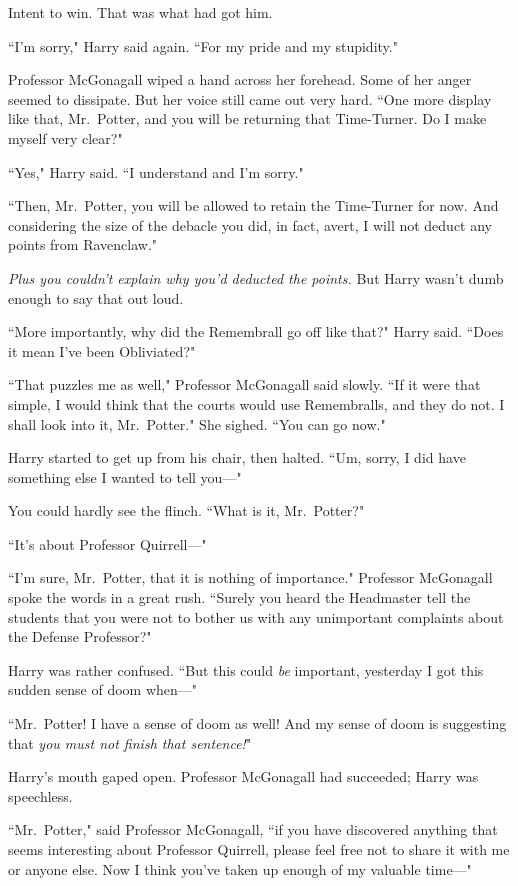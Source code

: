 Intent to win. That was what had got him.

``I'm sorry," Harry said again. ``For my pride and my stupidity."

Professor McGonagall wiped a hand across her forehead. Some of her anger seemed to dissipate. But her voice still came out very hard. ``One more display like that, Mr.~Potter, and you will be returning that Time-Turner. Do I make myself very clear?"

``Yes," Harry said. ``I understand and I'm sorry."

``Then, Mr.~Potter, you will be allowed to retain the Time-Turner for now. And considering the size of the debacle you did, in fact, avert, I will not deduct any points from Ravenclaw."

\emph{Plus you couldn't explain why you'd deducted the points.} But Harry wasn't dumb enough to say that out loud.

``More importantly, why did the Remembrall go off like that?" Harry said. ``Does it mean I've been Obliviated?"

``That puzzles me as well," Professor McGonagall said slowly. ``If it were that simple, I would think that the courts would use Remembralls, and they do not. I shall look into it, Mr.~Potter." She sighed. ``You can go now."

Harry started to get up from his chair, then halted. ``Um, sorry, I did have something else I wanted to tell you—"

You could hardly see the flinch. ``What is it, Mr.~Potter?"

``It's about Professor Quirrell—"

``I'm sure, Mr.~Potter, that it is nothing of importance." Professor McGonagall spoke the words in a great rush. ``Surely you heard the Headmaster tell the students that you were not to bother us with any unimportant complaints about the Defense Professor?"

Harry was rather confused. ``But this could \emph{be} important, yesterday I got this sudden sense of doom when—"

``Mr.~Potter! I have a sense of doom as well! And my sense of doom is suggesting that \emph{you must not finish that sentence!}"

Harry's mouth gaped open. Professor McGonagall had succeeded; Harry was speechless.

``Mr.~Potter," said Professor McGonagall, ``if you have discovered anything that seems interesting about Professor Quirrell, please feel free not to share it with me or anyone else. Now I think you've taken up enough of my valuable time—"

